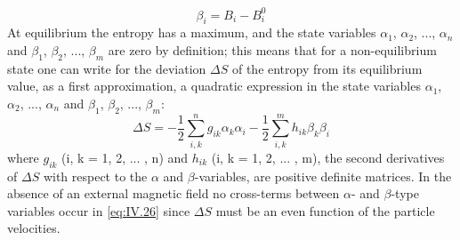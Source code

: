 \begin{equation}
\beta_i = B_i - B_i^0
    \label{eq:IV.25}
\end{equation}
At equilibrium the entropy has a maximum, and the state variables $\alpha_1$, $\alpha_2$, ..., $\alpha_n$ and $\beta_1$, $\beta_2$, ..., $\beta_m$ are zero by definition; this means that for a non-equilibrium state one can write for the deviation $\Delta S$ of the entropy from its equilibrium value, as a first approximation, a quadratic expression in the state variables $\alpha_1$, $\alpha_2$, ..., $\alpha_n$ and $\beta_1$, $\beta_2$, ..., $\beta_m$:
\begin{equation}
\Delta S = - \frac{1}{2} \sum_{i,k}^n g_{ik} \alpha_k \alpha_i - \frac{1}{2} \sum_{i,k}^m h_{ik} \beta_k \beta_i
    \label{eq:IV.26}
\end{equation}
where $g_{ik}$ (i, k = 1, 2, ... , n) and $h_{ik}$ (i, k = 1, 2, ... , m), the second derivatives of $\Delta S$ with respect to the $\alpha$ and $\beta$-variables, are positive definite matrices. In the absence of an external magnetic field no cross-terms between $\alpha$- and $\beta$-type variables occur in \eqref{eq:IV.26} since $\Delta S$ must be an even function of the particle velocities.

